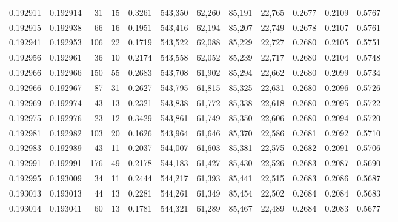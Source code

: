 \begin{tabular}{rrrrrrrrrrrrr}
0.192911 & 0.192914 &    31 &  15 &                                     0.3261 & 543,350 &  62,260 &  85,191 &  22,765 & 0.2677 & 0.2109 & 0.5767 \\
0.192915 & 0.192938 &    66 &  16 &                                     0.1951 & 543,416 &  62,194 &  85,207 &  22,749 & 0.2678 & 0.2107 & 0.5761 \\
0.192941 & 0.192953 &   106 &  22 &                                     0.1719 & 543,522 &  62,088 &  85,229 &  22,727 & 0.2680 & 0.2105 & 0.5751 \\
0.192956 & 0.192961 &    36 &  10 &                                     0.2174 & 543,558 &  62,052 &  85,239 &  22,717 & 0.2680 & 0.2104 & 0.5748 \\
0.192966 & 0.192966 &   150 &  55 &                                     0.2683 & 543,708 &  61,902 &  85,294 &  22,662 & 0.2680 & 0.2099 & 0.5734 \\
0.192966 & 0.192967 &    87 &  31 &                                     0.2627 & 543,795 &  61,815 &  85,325 &  22,631 & 0.2680 & 0.2096 & 0.5726 \\
0.192969 & 0.192974 &    43 &  13 &                                     0.2321 & 543,838 &  61,772 &  85,338 &  22,618 & 0.2680 & 0.2095 & 0.5722 \\
0.192975 & 0.192976 &    23 &  12 &                                     0.3429 & 543,861 &  61,749 &  85,350 &  22,606 & 0.2680 & 0.2094 & 0.5720 \\
0.192981 & 0.192982 &   103 &  20 &                                     0.1626 & 543,964 &  61,646 &  85,370 &  22,586 & 0.2681 & 0.2092 & 0.5710 \\
0.192983 & 0.192989 &    43 &  11 &                                     0.2037 & 544,007 &  61,603 &  85,381 &  22,575 & 0.2682 & 0.2091 & 0.5706 \\
0.192991 & 0.192991 &   176 &  49 &                                     0.2178 & 544,183 &  61,427 &  85,430 &  22,526 & 0.2683 & 0.2087 & 0.5690 \\
0.192995 & 0.193009 &    34 &  11 &                                     0.2444 & 544,217 &  61,393 &  85,441 &  22,515 & 0.2683 & 0.2086 & 0.5687 \\
0.193013 & 0.193013 &    44 &  13 &                                     0.2281 & 544,261 &  61,349 &  85,454 &  22,502 & 0.2684 & 0.2084 & 0.5683 \\
0.193014 & 0.193041 &    60 &  13 &                                     0.1781 & 544,321 &  61,289 &  85,467 &  22,489 & 0.2684 & 0.2083 & 0.5677 \\

\end{tabular}
